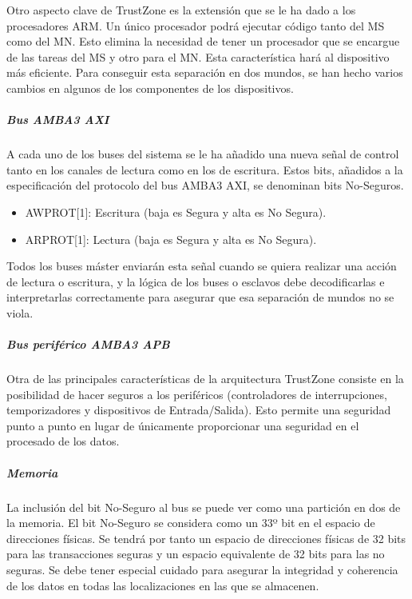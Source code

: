 Otro aspecto clave de TrustZone es la extensión que se le ha dado a los procesadores ARM. Un único procesador podrá ejecutar código tanto del MS como del MN. Esto elimina la necesidad de tener un procesador que se encargue de las tareas del MS y otro para el MN. Esta característica hará al dispositivo más eficiente. 
Para conseguir esta separación en dos mundos, se han hecho varios cambios en algunos de los componentes de los dispositivos.


\subparagraph{Bus AMBA3 AXI}
A cada uno de los buses del sistema se le ha añadido una nueva señal de control tanto en los canales de lectura como en los de escritura. Estos bits, añadidos a la especificación del protocolo del bus AMBA3 AXI, se denominan bits No-Seguros.
\begin{itemize}
	\item AWPROT[1]: Escritura (baja es Segura y alta es No Segura).
	\item ARPROT[1]: Lectura (baja es Segura y alta es No Segura).
\end{itemize}

Todos los buses máster enviarán esta señal cuando se quiera realizar una acción de lectura o escritura, y la lógica de los buses o esclavos debe decodificarlas e interpretarlas correctamente para asegurar que esa separación de mundos no se viola.

\subparagraph{Bus periférico AMBA3 APB}

Otra de las principales características de la arquitectura TrustZone consiste en la posibilidad de hacer seguros a los periféricos (controladores de interrupciones, temporizadores y dispositivos de Entrada/Salida). Esto permite una seguridad punto a punto en lugar de únicamente proporcionar una seguridad en el procesado de los datos.

\subparagraph{Memoria}

La inclusión del bit No-Seguro al bus se puede ver como una partición en dos de la memoria. El bit No-Seguro se considera como un 33º bit en el espacio de direcciones físicas. Se tendrá por tanto un espacio de direcciones físicas de 32 bits para las transacciones seguras y un espacio equivalente de 32 bits para las no seguras. Se debe tener especial cuidado para asegurar la integridad y coherencia de los datos en todas las localizaciones en las que se almacenen.

